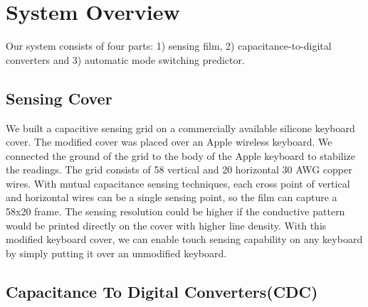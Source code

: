 \section{System Overview}
Our system consists of four parts: 1) sensing film, 2) capacitance-to-digital converters and 3) automatic mode switching predictor.

\subsection{Sensing Cover}

We built a capacitive sensing grid on a commercially available silicone keyboard cover.
The modified cover was placed over an Apple wireless keyboard.
We connected the ground of the grid to the body of the Apple keyboard to stabilize the readings.
The grid consists of 58 vertical and 20 horizontal 30 AWG copper wires.
With mutual capacitance sensing techniques, each cross point of vertical and horizontal wires can be a single sensing point, so the film can capture a 58x20 frame.
The sensing resolution could be higher if the conductive pattern would be printed directly on the cover with higher line density.
With this modified keyboard cover, we can enable touch sensing capability on any keyboard by simply putting it over an unmodified keyboard.

\subsection{Capacitance To Digital Converters(CDC)}

